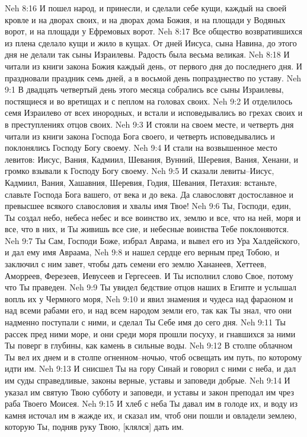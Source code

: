Neh 8:16  И пошел народ, и принесли, и сделали себе кущи, каждый на своей кровле и на дворах своих, и на дворах дома Божия, и на площади у Водяных ворот, и на площади у Ефремовых ворот.
Neh 8:17  Все общество возвратившихся из плена сделало кущи и жило в кущах. От дней Иисуса, сына Навина, до этого дня не делали так сыны Израилевы. Радость была весьма великая.
Neh 8:18  И читали из книги закона Божия каждый день, от первого дня до последнего дня. И праздновали праздник семь дней, а в восьмой день попразднество по уставу.
Neh 9:1  В двадцать четвертый день этого месяца собрались все сыны Израилевы, постящиеся и во вретищах и с пеплом на головах своих.
Neh 9:2  И отделилось семя Израилево от всех инородных, и встали и исповедывались во грехах своих и в преступлениях отцов своих.
Neh 9:3  И стояли на своем месте, и четверть дня читали из книги закона Господа Бога своего, и четверть исповедывались и поклонялись Господу Богу своему.
Neh 9:4  И стали на возвышенное место левитов: Иисус, Вания, Кадмиил, Шевания, Вунний, Шеревия, Вания, Хенани, и громко взывали к Господу Богу своему.
Neh 9:5  И сказали левиты--Иисус, Кадмиил, Вания, Хашавния, Шеревия, Годия, Шевания, Петахия: встаньте, славьте Господа Бога вашего, от века и до века. Да славословят достославное и превысшее всякого славословия и хвалы имя Твое!
Neh 9:6  Ты, Господи, един, Ты создал небо, небеса небес и все воинство их, землю и все, что на ней, моря и все, что в них, и Ты живишь все сие, и небесные воинства Тебе поклоняются.
Neh 9:7  Ты Сам, Господи Боже, избрал Аврама, и вывел его из Ура Халдейского, и дал ему имя Авраама,
Neh 9:8  и нашел сердце его верным пред Тобою, и заключил с ним завет, чтобы дать семени его землю Хананеев, Хеттеев, Аморреев, Ферезеев, Иевусеев и Гергесеев. И Ты исполнил слово Свое, потому что Ты праведен.
Neh 9:9  Ты увидел бедствие отцов наших в Египте и услышал вопль их у Чермного моря,
Neh 9:10  и явил знамения и чудеса над фараоном и над всеми рабами его, и над всем народом земли его, так как Ты знал, что они надменно поступали с ними, и сделал Ты Себе имя до сего дня.
Neh 9:11  Ты рассек пред ними море, и они среди моря прошли посуху, и гнавшихся за ними Ты поверг в глубины, как камень в сильные воды.
Neh 9:12  В столпе облачном Ты вел их днем и в столпе огненном--ночью, чтоб освещать им путь, по которому идти им.
Neh 9:13  И снисшел Ты на гору Синай и говорил с ними с неба, и дал им суды справедливые, законы верные, уставы и заповеди добрые.
Neh 9:14  И указал им святую Твою субботу и заповеди, и уставы и закон преподал им чрез раба Твоего Моисея.
Neh 9:15  И хлеб с неба Ты давал им в голоде их, и воду из камня источал им в жажде их, и сказал им, чтоб они пошли и овладели землею, которую Ты, подняв руку Твою, [клялся] дать им.
